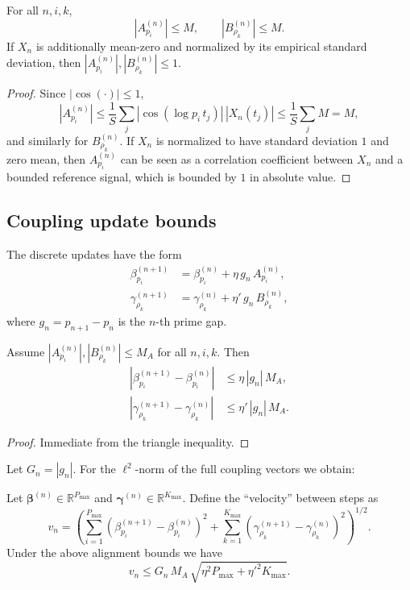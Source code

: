 \documentclass[11pt]{article}
\begin{document}
\begin{lemma}
For all $n,i,k$,
\[
|A_{p_i}^{(n)}| \le M,\qquad |B_{\rho_k}^{(n)}| \le M.
\]
If $X_n$ is additionally mean-zero and normalized by its empirical standard deviation, then $|A_{p_i}^{(n)}|,|B_{\rho_k}^{(n)}|\le 1$.
\end{lemma}

\begin{proof}
Since $|\cos(\cdot)|\le 1$,
\[
|A_{p_i}^{(n)}| \le \frac{1}{S}\sum_j |\cos(\log p_i\, t_j)|\,|X_n(t_j)| \le \frac{1}{S}\sum_j M = M,
\]
and similarly for $B_{\rho_k}^{(n)}$. If $X_n$ is normalized to have standard deviation $1$ and zero mean, then $A_{p_i}^{(n)}$ can be seen as a correlation coefficient between $X_n$ and a bounded reference signal, which is bounded by $1$ in absolute value.
\end{proof}

\subsection{Coupling update bounds}

The discrete updates have the form
\begin{align*}
\beta_{p_i}^{(n+1)} &= \beta_{p_i}^{(n)} + \eta\, g_n\, A_{p_i}^{(n)}, \\
\gamma_{\rho_k}^{(n+1)} &= \gamma_{\rho_k}^{(n)} + \eta'\, g_n\, B_{\rho_k}^{(n)},
\end{align*}
where $g_n = p_{n+1}-p_n$ is the $n$-th prime gap.

\begin{lemma}
Assume $|A_{p_i}^{(n)}|,|B_{\rho_k}^{(n)}|\le M_A$ for all $n,i,k$. Then
\begin{align*}
|\beta_{p_i}^{(n+1)} - \beta_{p_i}^{(n)}| &\le \eta\, |g_n|\, M_A, \\
|\gamma_{\rho_k}^{(n+1)} - \gamma_{\rho_k}^{(n)}| &\le \eta'\, |g_n|\, M_A.
\end{align*}
\end{lemma}

\begin{proof}
Immediate from the triangle inequality.
\end{proof}

Let $G_n = |g_n|$. For the $\ell^2$-norm of the full coupling vectors we obtain:

\begin{proposition}
Let $\bm{\beta}^{(n)}\in\mathbb{R}^{P_{\max}}$ and $\bm{\gamma}^{(n)}\in\mathbb{R}^{K_{\max}}$. Define the “velocity” between steps as
\[
v_n = \left( \sum_{i=1}^{P_{\max}} \left(\beta_{p_i}^{(n+1)} - \beta_{p_i}^{(n)}\right)^2
+ \sum_{k=1}^{K_{\max}} \left(\gamma_{\rho_k}^{(n+1)} - \gamma_{\rho_k}^{(n)}\right)^2 \right)^{1/2}.
\]
Under the above alignment bounds we have
\[
v_n \le G_n\, M_A\, \sqrt{\eta^2 P_{\max} + \eta'^2 K_{\max}}.
\]
\end{proposition}
\end{document}
